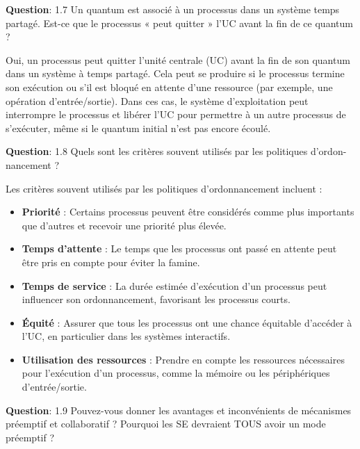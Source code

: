 \newpage

\noindent \textbf{Question}: 1.7 Un quantum est associé à un processus dans un système temps partagé. Est-ce que le processus « peut quitter » l'UC avant la fin de ce quantum ?

\noindent Oui, un processus peut quitter l'unité centrale (UC) avant la fin de son quantum dans un système à temps partagé. Cela peut se produire si le processus termine son exécution ou s'il est bloqué en attente d'une ressource (par exemple, une opération d'entrée/sortie). Dans ces cas, le système d'exploitation peut interrompre le processus et libérer l'UC pour permettre à un autre processus de s'exécuter, même si le quantum initial n'est pas encore écoulé.

\vspace{0.5cm}

\noindent \textbf{Question}: 1.8 Quels sont les critères souvent utilisés par les politiques d'ordon-nancement ?

\noindent Les critères souvent utilisés par les politiques d'ordonnancement incluent :
\begin{itemize}
	\item \textbf{Priorité} : Certains processus peuvent être considérés comme plus importants que d'autres et recevoir une priorité plus élevée.
	\item \textbf{Temps d'attente} : Le temps que les processus ont passé en attente peut être pris en compte pour éviter la famine.
	\item \textbf{Temps de service} : La durée estimée d'exécution d'un processus peut influencer son ordonnancement, favorisant les processus courts.
	\item \textbf{Équité} : Assurer que tous les processus ont une chance équitable d'accéder à l'UC, en particulier dans les systèmes interactifs.
	\item \textbf{Utilisation des ressources} : Prendre en compte les ressources nécessaires pour l'exécution d'un processus, comme la mémoire ou les périphériques d'entrée/sortie.
\end{itemize}

\vspace{0.5cm}

\noindent \textbf{Question}: 1.9 Pouvez-vous donner les avantages et inconvénients de mécanismes préemptif et collaboratif ? Pourquoi les SE devraient TOUS avoir un mode préemptif ?

\vspace{0.5cm}


